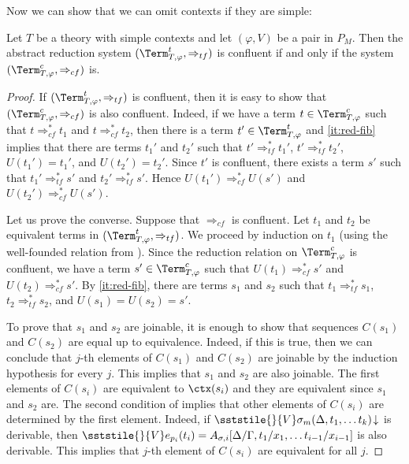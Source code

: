 Now we can show that we can omit contexts if they are simple:
\begin{prop}
Let $T$ be a theory with simple contexts and let $(\varphi,V)$ be a pair in $P_M$.
Then the abstract reduction system $(\Term_{T,\varphi}^t, \Rightarrow_{tf})$ is confluent if and only if the system $(\Term_{T,\varphi}^c, \Rightarrow_{cf})$ is.
\end{prop}
\begin{proof}
If $(\Term_{T,\varphi}^t,\Rightarrow_{tf})$ is confluent, then it is easy to show that $(\Term_{T,\varphi}^c,\Rightarrow_{cf})$ is also confluent.
Indeed, if we have a term $t \in \Term_{T,\varphi}^c$ such that $t \Rightarrow_{cf}^* t_1$ and $t \Rightarrow_{cf}^* t_2$,
then there is a term $t' \in \Term_{T,\varphi}^t$ and \eqref{it:red-fib} implies that there are terms $t_1'$ and $t_2'$ such that
$t' \Rightarrow_{tf}^* t_1'$, $t' \Rightarrow_{tf}^* t_2'$, $U(t_1') = t_1'$, and $U(t_2') = t_2'$.
Since $t'$ is confluent, there exists a term $s'$ such that $t_1' \Rightarrow_{tf}^* s'$ and $t_2' \Rightarrow_{tf}^* s'$.
Hence $U(t_1') \Rightarrow_{cf}^* U(s')$ and $U(t_2') \Rightarrow_{cf}^* U(s')$.

Let us prove the converse.
Suppose that $\Rightarrow_{cf}$ is confluent.
Let $t_1$ and $t_2$ be equivalent terms in $(\Term_{T,\varphi}^t,\Rightarrow_{tf})$.
We proceed by induction on $t_1$ (using the well-founded relation from ).
Since the reduction relation on $\Term_{T,\varphi}^c$ is confluent, we have a term $s' \in \Term_{T,\varphi}^c$ such that $U(t_1) \Rightarrow_{cf}^* s'$ and $U(t_2) \Rightarrow_{cf}^* s'$.
By \eqref{it:red-fib}, there are terms $s_1$ and $s_2$ such that $t_1 \Rightarrow_{tf}^* s_1$, $t_2 \Rightarrow_{tf}^* s_2$, and $U(s_1) = U(s_2) = s'$.

To prove that $s_1$ and $s_2$ are joinable, it is enough to show that sequences $C(s_1)$ and $C(s_2)$ are equal up to equivalence.
Indeed, if this is true, then we can conclude that $j$-th elements of $C(s_1)$ and $C(s_2)$ are joinable by the induction hypothesis for every $j$.
This implies that $s_1$ and $s_2$ are also joinable.
The first elements of $C(s_i)$ are equivalent to $\ctx(s_i)$ and they are equivalent since $s_1$ and $s_2$ are.
The second condition of  implies that other elements of $C(s_i)$ are determined by the first element.
Indeed, if $\sststile{}{V} \sigma_m(\Delta, t_1, \ldots t_k)\!\downarrow$ is derivable, then $\sststile{}{V} e_{p_i}(t_i) = A_{\sigma,i}[\Delta/\Gamma, t_1/x_1, \ldots t_{i-1}/x_{i-1}]$ is also derivable.
This implies that $j$-th element of $C(s_i)$ are equivalent for all $j$.
\end{proof}

